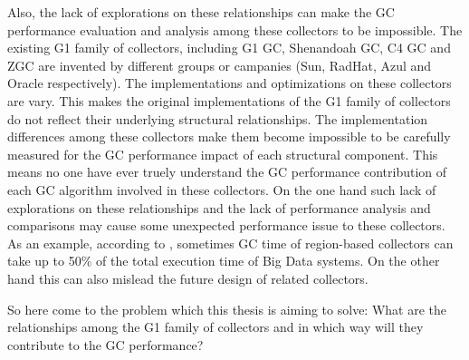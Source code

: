 Also, the lack of explorations on these relationships can make the GC performance evaluation
and analysis among these collectors to be impossible.
The existing G1 family of collectors, including
G1 GC, Shenandoah GC, C4 GC and ZGC are invented by different groups or campanies (Sun, RadHat, Azul and Oracle respectively).
The implementations and optimizations on these collectors are vary.
This makes the original implementations of the G1 family of collectors do not reflect
their underlying structural relationships.
The implementation differences among these collectors make them become impossible
to be carefully measured for the GC performance impact of each structural component.
This means no one have ever truely understand the GC performance contribution of each
GC algorithm involved in these collectors.
On the one hand such lack of explorations on these relationships and the lack of
performance analysis and comparisons may cause some unexpected performance issue to these collectors.
As an example, according to \cite{briandemsky2015speculative}, sometimes GC time of region-based collectors
can take up to 50\% of the total execution time of Big Data systems.
On the other hand this can also mislead the future design of related collectors.

So here come to the problem which this thesis is aiming to solve: What are the relationships
among the G1 family of collectors and in which way will they contribute to the GC performance?





